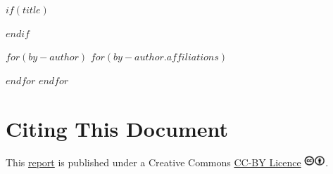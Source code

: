 
$if(title)$
  \par%
$endif$
{}\hfill
{}
        
\begin{flushleft}
  \vspace{0.5cm} 
  $for(by-author)$
    {} 
    $for(by-author.affiliations)$
      \hskip 10pt{} \par%
    $endfor$ 
  $endfor$
\end{flushleft}


\newpage

\thispagestyle{empty}

\section*{Citing This Document}

This \href{$citation.url$}{report} is published under a Creative Commons \href{https://creativecommons.org/licenses/by/4.0/}{CC-BY Licence} \includegraphics[height=11pt]{images/cc-by.png}.

